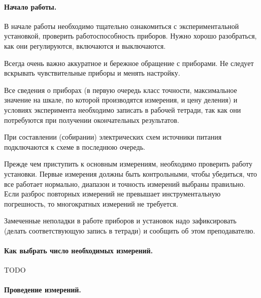 \documentclass[10pt]{article}
\begin{document}
\paragraph{Начало работы.}

\begin{lyxgreyedout}
В начале работы необходимо тщательно ознакомиться с экспериментальной
установкой, проверить работоспособность приборов. Нужно хорошо разобраться,
как они регулируются, включаются и выключаются.

Всегда очень важно аккуратное и бережное обращение с приборами. Не
следует вскрывать чувствительные приборы и менять настройку.

Все сведения о приборах (в первую очередь класс точности, максимальное
значение на шкале, по которой производятся измерения, и цену деления)
и условиях эксперимента необходимо записать в рабочей тетради, так
как они потребуются при получении окончательных результатов.

При составлении (собирании) электрических схем источники питания подключаются
к схеме в последнюю очередь.

Прежде чем приступить к основным измерениям, необходимо проверить
работу установки. Первые измерения должны быть контрольными, чтобы
убедиться, что все работает нормально, диапазон и точность измерений
выбраны правильно. Если разброс повторных измерений не превышает инструментальную
погрешность, то многократных измерений не требуется.

Замеченные неполадки в работе приборов и установок надо зафиксировать
(делать соответствующую запись в тетради) и сообщить об этом преподавателю.%
\end{lyxgreyedout}


\paragraph{Как выбрать число необходимых измерений.}

TODO

\paragraph{Проведение измерений.}
\end{document}

